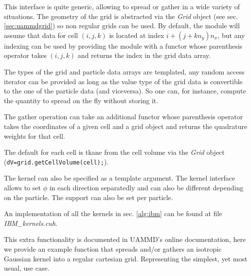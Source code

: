 \documentclass[ twoside,openright,titlepage,numbers=noenddot,%
headinclude,footinclude,cleardoublepage=empty,abstract=on,
BCOR=5mm,paper=a4,fontsize=11pt, dvipsnames
]{scrreprt}
\def\ucpp{uammd_cpp_lexer.py:UAMMDCppLexer -x}
\newcommand{\uammd}{\gls{UAMMD}\xspace}
\begin{document}
This interface is quite generic, allowing to spread or gather in a wide variety of situations. The geometry of the grid is abstracted via the \emph{Grid} object (see sec. \ref{sec:uammdgrid}) so non regular grids can be used. By default, the module will assume that data for cell $(i,j,k)$ is located at index $i+(j+kn_y)n_x$, but any indexing can be used by providing the module with a functor whose parenthesis operator takes $(i,j,k)$ and returns the index in the grid data array.

The types of the grid and particle data arrays are templated, any random access iterator can be provided as long as the value type of the grid data is convertible to the one of the particle data (and viceversa). So one can, for instance, compute the quantity to spread on the fly without storing it.

The gather operation can take an additional functor whose parenthesis operator takes the coordinates of a given cell and a grid object and returns the quadrature weights for that cell.

The default for each cell is tkane from the cell volume via the \emph{Grid} object (\texttt{dV=grid.getCellVolume(cell);}).

The kernel can also be specified as a template argument. The kernel interface allows to set $\phi$ in each direction separatedly and can also be different depending on the particle. The support can also be set per particle.

An implementation of all the kernels in sec. \ref{alg:ibm} can be found at file \emph{IBM\_kernels.cuh}.

This extra functionality is documented in \uammd's online documentation, here we provide an example function that spreads and/or gathers an isotropic Gaussian kernel into a regular cartesian grid. Representing the simplest, yet most usual, use case.
\end{document}
